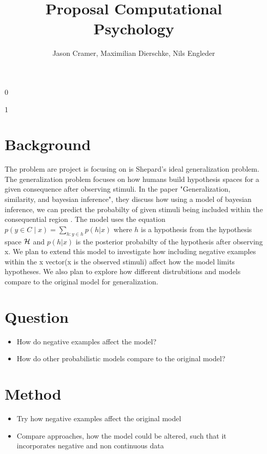 \documentclass[]{scrartcl}
\title{Proposal Computational Psychology}
\begin{document}
\def\isblind{1}
\if\isblind0
    \author{Jason Cramer, Maximilian Dierschke, Nils Engleder}\fi
\if \isblind1
    \author{}\fi
\maketitle
\section{Background}
The problem are project is focusing on is Shepard's ideal generalization problem. The generalization problem focuses on how humans build hypothesis spaces for a given consequence after observing stimuli.
In the paper "Generalization, similarity, and bayesian inference", they discuss how using a model of bayesian inference, we can predict the probabilty of given stimuli being included within the consequential region \cite{Tenenbaum}.
The model uses the equation $p(y \in C \mid x) = \sum\limits_{h:y\in h} p(h | x)$ where $h$ is a hypothesis from the hypothesis space ${\cal H}$ and $p(h | x)$ is the posterior probabilty of  the hypothesis after observing x.
We plan to extend this model to investigate how including negative examples within the x vector(x is the observed stimuli) affect how the model limits hypotheses. We also plan to explore how different distrubitions and models compare to the original model for generalization.
\section{Question}
\begin{itemize}
\item How do negative examples affect the model?
\item How do other probabilistic models compare to the original model?
\end{itemize}
\section{Method}
\begin{itemize}
	\item Try how negative examples affect the original model
	\item Compare approaches, how the model could be altered, such that it incorporates negative and non continuous data
\end{itemize} 
\nocite{*}
\printbibliography
\end{document}
